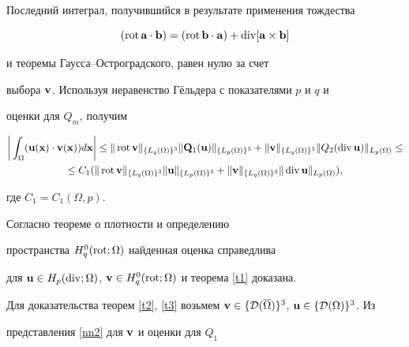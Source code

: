 Последний интеграл, получившийся в результате применения тождества


$$


(\Rot\bold{a}\cdot\bold{b})=(\Rot\bold{b}\cdot\bold{a})+


\Div[\bold{a}\times\bold{b}]


$$


и теоремы Гаусса--Остроградского, равен нулю за счет


выбора $\bold{v}$. Используя неравенство Г\"ель\-де\-ра с показателями $p$ и $q$ и


оценки для $Q_m$, получим


\begin{multline*}


\bigg|\int_{\Omega}(\bold{u}(\bold{x})\cdot\bold{v}(\bold{x}))d\bold{x}\bigg|\leq


\|\Rot\bold{v}\|_{\{L_q(\Omega)\}^3}\|\bold{Q}_1(\bold{u})\|_


{\{L_p(\Omega)\}^3}+ 


\|\bold{v}\|_{\{L_q(\Omega)\}^3}\|Q_2(


\Div\bold{u})\|_ {L_p(\Omega)}\leq \\


%


\leq C_1(\|


\Rot\bold{v}\|_{\{L_q(\Omega)\}^3}\|\bold{u}\|_


{\{L_p(\Omega)\}^3}+\|\bold{v}\|_{\{L_q(\Omega)\}^3}\|\Div\bold{u}\|_


{L_p(\Omega)}),


\end{multline*}


где $C_1=C_1(\Omega,p)$.





Согласно теореме о плотности и определению


пространства $H_q^0(\operatorname{rot};\Omega)$ найденная оценка справедлива


для $\bold{u}\in H_p(\Div;\Omega)$, $\bold{v}\in


H_q^0(\Rot;\Omega)$ и теорема \ref{t1} доказана.





Для доказательства теорем \ref{t2}, \ref{t3} возьмем $\bold{v}\in\{{\cal


D}(\overline{\Omega})\}^3$, $\bold{u}\in\{{\cal D}(\Omega)\}^3$. Из


представления \eqref{nn2} для $\bold{v}$ и оценки для $Q_1$


